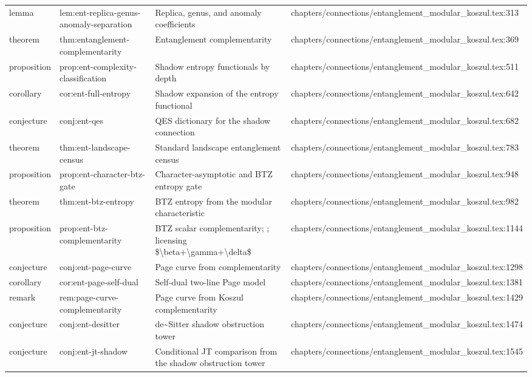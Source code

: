 \documentclass[11pt]{article}
\begin{document}
\begin{longtable}{L{0.10\textwidth}L{0.26\textwidth}L{0.42\textwidth}L{0.22\textwidth}}
lemma & lem:ent-replica-genus-anomaly-separation & Replica, genus, and anomaly coefficients & chapters/connections/entanglement\_modular\_koszul.tex:313\\
theorem & thm:entanglement-complementarity & Entanglement complementarity & chapters/connections/entanglement\_modular\_koszul.tex:369\\
proposition & prop:ent-complexity-classification & Shadow entropy functionals by depth & chapters/connections/entanglement\_modular\_koszul.tex:511\\
corollary & cor:ent-full-entropy & Shadow expansion of the entropy functional & chapters/connections/entanglement\_modular\_koszul.tex:642\\
conjecture & conj:ent-qes & QES dictionary for the shadow connection & chapters/connections/entanglement\_modular\_koszul.tex:682\\
theorem & thm:ent-landscape-census & Standard landscape entanglement census & chapters/connections/entanglement\_modular\_koszul.tex:783\\
proposition & prop:ent-character-btz-gate & Character-asymptotic and BTZ entropy gate & chapters/connections/entanglement\_modular\_koszul.tex:948\\
theorem & thm:ent-btz-entropy & BTZ entropy from the modular characteristic & chapters/connections/entanglement\_modular\_koszul.tex:982\\
proposition & prop:ent-btz-complementarity & BTZ scalar complementarity; ; licensing \$\textbackslash{}beta+\textbackslash{}gamma+\textbackslash{}delta\$ & chapters/connections/entanglement\_modular\_koszul.tex:1144\\
conjecture & conj:ent-page-curve & Page curve from complementarity & chapters/connections/entanglement\_modular\_koszul.tex:1298\\
corollary & cor:ent-page-self-dual & Self-dual two-line Page model & chapters/connections/entanglement\_modular\_koszul.tex:1381\\
remark & rem:page-curve-complementarity & Page curve from Koszul complementarity & chapters/connections/entanglement\_modular\_koszul.tex:1429\\
conjecture & conj:ent-desitter & de\textasciitilde{}Sitter shadow obstruction tower & chapters/connections/entanglement\_modular\_koszul.tex:1474\\
conjecture & conj:ent-jt-shadow & Cond{}itional JT comparison from the shadow obstruction tower & chapters/connections/entanglement\_modular\_koszul.tex:1545\\

\end{longtable}
\end{document}
